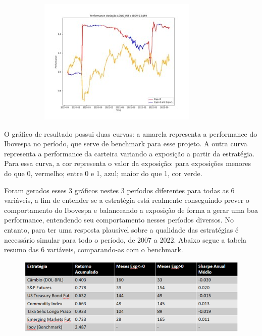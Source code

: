 \begin{figure}[H]
\begin{subfigure}{0.45\linewidth}
    \end{subfigure}
    \begin{subfigure}{0.45\linewidth}
        \includegraphics[width = \textwidth]{relatorios/consult/imagens/Imagem5.jpg}
    \end{subfigure}   

\end{figure}

O gráfico de resultado possui duas curvas: a amarela representa a performance do Ibovespa no período, que serve de benchmark para esse projeto. A outra curva representa a performance da carteira variando a exposição a partir da estratégia. Para essa curva, a cor representa o valor da exposição: para exposições menores do que 0, vermelho; entre 0 e 1, azul; maior do que 1, cor verde.

Foram gerados esses 3 gráficos nestes 3 períodos diferentes para todas as 6 variáveis, a fim de entender se a estratégia está realmente conseguindo prever o comportamento do Ibovespa e balanceando a exposição de forma a gerar uma boa performance, entendendo seu comportamento nesses períodos diversos. No entanto, para ter uma resposta plausível sobre a qualidade das estratégias é necessário simular para todo o período, de 2007 a 2022. Abaixo segue a tabela resumo das 6 variáveis, comparando-as com o benchmark.

\begin{figure}
    \includegraphics[width = \linewidth]{relatorios/consult/imagens/tabela.png}
\end{figure}

